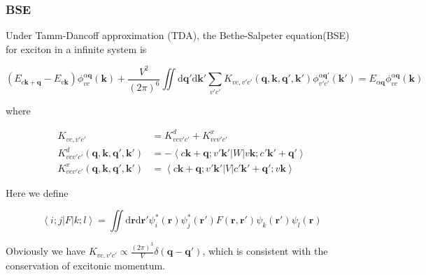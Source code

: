 \subsubsection{BSE}

Under Tamm-Dancoff approximation (TDA), the Bethe-Salpeter equation(BSE) for exciton in a infinite system is

\begin{equation}\label{BSE-infinite}
  (E_{c\boldsymbol{k} + \boldsymbol{q}} - E_{v\boldsymbol{k}}) \phi_{vc}^{\alpha\boldsymbol{q}}(\boldsymbol{k}) 
  + \frac{V^2}{(2\pi)^6} \iint \mathrm{d}\boldsymbol{q}' \mathrm{d}\boldsymbol{k}' \sum_{v'c'} 
    K_{vc,v'c'}^{}(\boldsymbol{q}, \boldsymbol{k}, \boldsymbol{q}', \boldsymbol{k}') 
    \phi_{v'c'}^{\alpha\boldsymbol{q}'} (\boldsymbol{k}') 
  = E_{\alpha \boldsymbol{q}} \phi_{vc}^{\alpha\boldsymbol{q}}(\boldsymbol{k}) 
\end{equation}

\noindent
where

\begin{equation}
  \begin{aligned}
    K_{vc,v'c'}^{} 
      &= K_{vcv'c'}^{d} + K_{vcv'c'}^{x} \\
    K_{vcv'c'}^{d}(\boldsymbol{q}, \boldsymbol{k}, \boldsymbol{q}', \boldsymbol{k}') 
      &= -\left\langle c\boldsymbol{k}+\boldsymbol{q};v'\boldsymbol{k}' \left| W \right| v\boldsymbol{k};c'\boldsymbol{k}'+\boldsymbol{q}' \right\rangle \\
    K_{vcv'c'}^{x}(\boldsymbol{q}, \boldsymbol{k}, \boldsymbol{q}', \boldsymbol{k}')
      &= \left\langle c\boldsymbol{k}+\boldsymbol{q};v'\boldsymbol{k}' \left| V \right| c'\boldsymbol{k}'+\boldsymbol{q}';v\boldsymbol{k} \right\rangle
  \end{aligned}
\end{equation}

\noindent
Here we define

\begin{equation}
  \left\langle i;j \left| F \right| k;l \right\rangle 
    = \iint \mathrm{d} \boldsymbol{r} \mathrm{d} \boldsymbol{r}'
      \psi_{i}^{*}(\boldsymbol{r}) \psi_{j}^{*}(\boldsymbol{r}') 
      F(\boldsymbol{r},\boldsymbol{r}') 
      \psi_{k}^{}(\boldsymbol{r}') \psi_{l}^{}(\boldsymbol{r})
\end{equation}

\noindent
Obviously we have $K_{vc,v'c'}^{} \propto \frac{(2\pi)^3}{V} \delta(\boldsymbol{q} - \boldsymbol{q}')$, 
which is consistent with the conservation of excitonic momentum.


